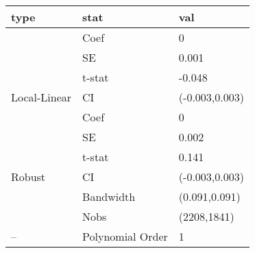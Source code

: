 
\begin{tabular}{lll}
\toprule
type & stat & val\\
\midrule
 & Coef & 0\\

 & SE & 0.001\\

 & t-stat & -0.048\\

\multirow{-4}{*}{\raggedright\arraybackslash Local-Linear} & CI & (-0.003,0.003)\\
\cmidrule{1-3}
 & Coef & 0\\

 & SE & 0.002\\

 & t-stat & 0.141\\

\multirow{-4}{*}{\raggedright\arraybackslash Robust} & CI & (-0.003,0.003)\\
\cmidrule{1-3}
 & Bandwidth & (0.091,0.091)\\

 & Nobs & (2208,1841)\\

\multirow{-3}{*}{\raggedright\arraybackslash --} & Polynomial Order & 1\\
\bottomrule
\end{tabular}